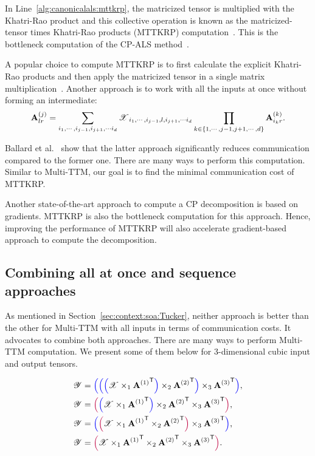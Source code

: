 \documentclass[a4paper,11pt]{article}
\newcommand{\X}{\T{X}}
\newcommand{\Y}{\T{Y}}
\newcommand{\allatoncecolor}{\color{purple}}
\newcommand{\seqcolor}{\color{blue}}
\newcommand{\allatoncestart}{{\allatoncecolor\Big(}}
\newcommand{\allatonceend}{{\allatoncecolor\Big)}}
\newcommand{\seqstart}{{\seqcolor\Big(}}
\newcommand{\seqend}{{\seqcolor\Big)}}
\begin{document}
	In Line~\ref{alg:canonicalals:mttkrp}, the matricized tensor is multiplied with the Khatri-Rao product and this collective operation is known as the matricized-tensor times Khatri-Rao products (MTTKRP) computation~\cite{LCPSV-IPDPS-2017}. This is the bottleneck computation of the CP-ALS method~\cite{BNR-IPDPS-2018,LCPSV-IPDPS-2017}.
	
	A popular choice to compute MTTKRP is to first calculate the explicit Khatri-Rao products and then apply the matricized tensor in a single matrix multiplication~\cite{BK-SIAM-2008}. Another approach is to work with all the inputs at once without forming an intermediate: 
	$$\Mn{A}{j}_{lr} = \sum_{i_1,\cdots,i_{j-1},i_{j+1},\cdots i_d}\X_{i_1,\cdots,i_{j-1},l,i_{j+1},\cdots i_d}\prod_{k\in{\{1,\cdots,j-1,j+1,\cdots,d\}}}\Mn{A}{k}_{i_k r}.$$
	
	Ballard et al.~\cite{BNR-IPDPS-2018} show that the latter approach significantly reduces communication compared to the former one. There are many ways to perform this computation. Similar to Multi-TTM, our goal is to find the minimal communication cost of MTTKRP. 
	
	
	Another state-of-the-art approach to compute a CP decomposition is based on gradients. MTTKRP is also the bottleneck computation for this approach. Hence, improving the performance of MTTKRP will also accelerate gradient-based approach to compute the decomposition.
	
	
	\subsection{Combining all at once and sequence approaches}
	\label{sec:combinedapproach}
	As mentioned in Section~\ref{sec:context:soa:Tucker}, neither approach is better than the other for Multi-TTM with all inputs in terms of communication costs.  It advocates to combine both approaches. There are many ways to perform Multi-TTM computation.  We present some of them below for  3-dimensional cubic input and output tensors.	 
	
	\begin{align*}
		\Y&=\seqstart\seqstart\seqstart\X\times_1{\Mn{A}{1}}^\Tra \seqend\times_2{\Mn{A}{2}}^\Tra\seqend\times_3{\Mn{A}{3}}^\Tra\seqend,\\
		\Y&=\allatoncestart\seqstart\X \times_1 {\Mn{A}{1}}^\Tra \seqend \times_2 {\Mn{A}{2}}^\Tra \times_3 {\Mn{A}{3}}^\Tra \allatonceend,\\
		\Y &= \seqstart\allatoncestart\X \times_1 {\Mn{A}{1}}^\Tra \times_2 {\Mn{A}{2}}^\Tra\allatonceend \times_3 {\Mn{A}{3}}^\Tra\seqend,\\
		\Y &= \allatoncestart\X \times_1 {\Mn{A}{1}}^\Tra \times_2 {\Mn{A}{2}}^\Tra \times_3 {\Mn{A}{3}}^\Tra\allatonceend.
	\end{align*}
	
\end{document}
